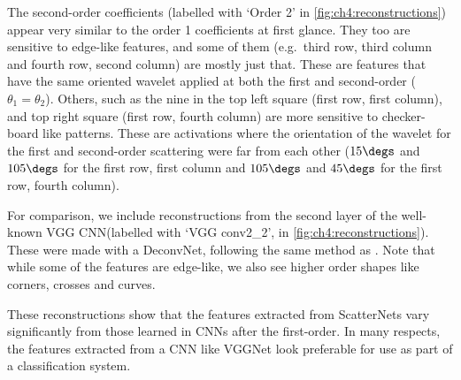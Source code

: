 {The second-order coefficients (labelled with `Order
2' in \autoref{fig:ch4:reconstructions}) appear very similar to the order
1 coefficients at first glance.
They too are sensitive to edge-like features, and some of them (e.g.\ third row,
third column and fourth row, second column) are mostly just that. These are
features that have the same oriented wavelet applied at both the first and
second-order ($\theta_1 = \theta_2$). Others, such as the nine in the top left
square (first row, first column), and top right square (first row, fourth
column) are more sensitive to checker-board like patterns. These are
activations where the orientation of the wavelet for the first and second-order
scattering were far from each other ($15\degs$ and $105\degs$ for the first row,
first column and $105\degs$ and $45\degs$ for the first row, fourth column).

For comparison, we include reconstructions from the second layer of the
well-known VGG CNN\@ (labelled with `VGG conv2\_2', in
\autoref{fig:ch4:reconstructions}). These were made with a DeconvNet, following the
same method as \cite{zeiler_visualizing_2014}. Note that while some of
the features are edge-like, we also see higher order shapes like corners,
crosses and curves.

These reconstructions show that the features extracted from ScatterNets vary
significantly from those learned in CNNs after the first-order. In many
respects, the features extracted from a CNN like VGGNet look preferable for use
as part of a classification system.
}
